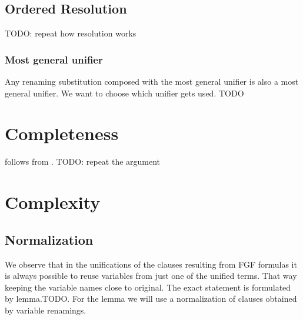 \documentclass[english, shortabstract]{iithesis}
\theoremstyle{definition} \newtheorem{definition}{Definition}[chapter]
\theoremstyle{remark} \newtheorem{remark}[definition]{Observation}
\theoremstyle{plain} \newtheorem{theorem}[definition]{Theorem}
\theoremstyle{plain} \newtheorem{lemma}[definition]{Lemma}
\begin{document}
\section{Ordered Resolution}
TODO: repeat how resolution works

\subsection{Most general unifier}
Any renaming substitution composed with the most general unifier is also a most general unifier.
We want to choose which unifier gets used. TODO




    

\chapter{Completeness}

follows from \cite{resolution gf}. TODO: repeat the argument

\chapter{Complexity}

\section{Normalization}
We observe that in the unifications of the clauses resulting from FGF formulas it is always possible to reuse variables from just one of the unified terms.
That way keeping the variable names close to original. The exact statement is formulated by lemma.TODO. 
For the lemma we will use a normalization of clauses obtained by variable renamings.
\end{document}
